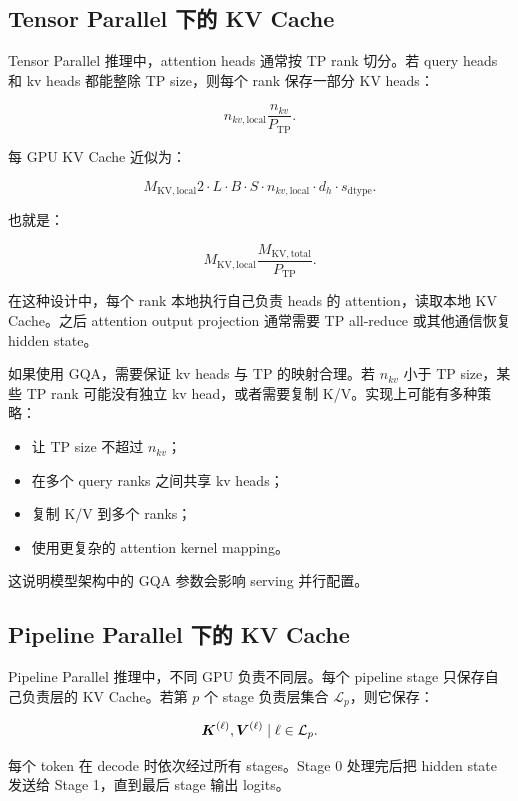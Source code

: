\subsection{Tensor Parallel 下的 KV Cache}
\label{subsec:kv-cache-under-tensor-parallel}

Tensor Parallel 推理中，attention heads 通常按 TP rank 切分。若 query heads 和 kv heads 都能整除 TP size，则每个 rank 保存一部分 KV heads：

\[
n_{kv,\mathrm{local}}
\frac{n_{kv}}{P_{\mathrm{TP}}}.
\]

每 GPU KV Cache 近似为：

\[
M_{\mathrm{KV,local}}
2
\cdot
L
\cdot
B
\cdot
S
\cdot
n_{kv,\mathrm{local}}
\cdot
d_h
\cdot
s_{\mathrm{dtype}}.
\]

也就是：

\[
M_{\mathrm{KV,local}}
\frac{M_{\mathrm{KV,total}}}{P_{\mathrm{TP}}}.
\]

在这种设计中，每个 rank 本地执行自己负责 heads 的 attention，读取本地 KV Cache。之后 attention output projection 通常需要 TP all-reduce 或其他通信恢复 hidden state。

如果使用 GQA，需要保证 kv heads 与 TP 的映射合理。若 $n_{kv}$ 小于 TP size，某些 TP rank 可能没有独立 kv head，或者需要复制 K/V。实现上可能有多种策略：

\begin{itemize}
\item 让 TP size 不超过 $n_{kv}$；
\item 在多个 query ranks 之间共享 kv heads；
\item 复制 K/V 到多个 ranks；
\item 使用更复杂的 attention kernel mapping。
\end{itemize}

这说明模型架构中的 GQA 参数会影响 serving 并行配置。

\subsection{Pipeline Parallel 下的 KV Cache}
\label{subsec:kv-cache-under-pipeline-parallel}

Pipeline Parallel 推理中，不同 GPU 负责不同层。每个 pipeline stage 只保存自己负责层的 KV Cache。若第 $p$ 个 stage 负责层集合 $\mathcal{L}_p$，则它保存：

\[
{\bm{K}^{(\ell)},\bm{V}^{(\ell)}\mid \ell\in\mathcal{L}_p}.
\]

每个 token 在 decode 时依次经过所有 stages。Stage 0 处理完后把 hidden state 发送给 Stage 1，直到最后 stage 输出 logits。

